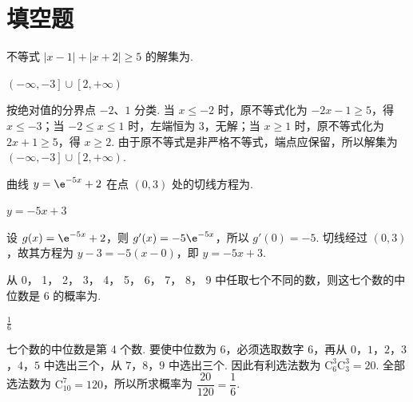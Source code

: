\section{填空题}

\begin{problem}
不等式 \( |x - 1| + |x + 2| \geqslant 5 \) 的解集为\fillinblank{}.
\end{problem}

\begin{answer}
\(\left(-\infty,-3\right]\cup\left[2,+\infty\right)\)
\end{answer}

\begin{solution}
按绝对值的分界点 \(-2\)、\(1\) 分类. 当 \(x\leqslant-2\) 时，原不等式化为
\(-2x-1\geqslant5\)，得 \(x\leqslant-3\)；当 \(-2\leqslant x\leqslant1\) 时，左端恒为 \(3\)，无解；当 \(x\geqslant1\) 时，原不等式化为 \(2x+1\geqslant5\)，得 \(x\geqslant2\). 由于原不等式是非严格不等式，端点应保留，所以解集为
\(\left(-\infty,-3\right]\cup\left[2,+\infty\right)\).
\end{solution}

\begin{problem}
曲线 \( y = \e^{-5x} + 2 \) 在点 \((0, 3)\) 处的切线方程为\fillinblank{}.
\end{problem}

\begin{answer}
\(y=-5x+3\)
\end{answer}

\begin{solution}
设 \(g(x)=\e^{-5x}+2\)，则 \(g'(x)=-5\e^{-5x}\)，所以 \(g'(0)=-5\). 切线经过 \((0,3)\)，故其方程为
\(y-3=-5(x-0)\)，即 \(y=-5x+3\).
\end{solution}

\begin{problem}
从 0， 1， 2， 3， 4， 5， 6， 7， 8， 9 中任取七个不同的数，则这七个数的中位数是 6 的概率为\fillinblank{}.
\end{problem}

\begin{answer}
\(\frac{1}{6}\)
\end{answer}

\begin{solution}
七个数的中位数是第 4 个数. 要使中位数为 \(6\)，必须选取数字 \(6\)，再从 \(0\)，\(1\)，\(2\)，\(3\)，\(4\)，\(5\) 中选出三个，从 \(7\)，\(8\)，\(9\) 中选出三个. 因此有利选法数为
\(\mathrm C_6^3\mathrm C_3^3=20\). 全部选法数为 \(\mathrm C_{10}^7=120\)，所以所求概率为
\(\dfrac{20}{120}=\dfrac16\).
\end{solution}

